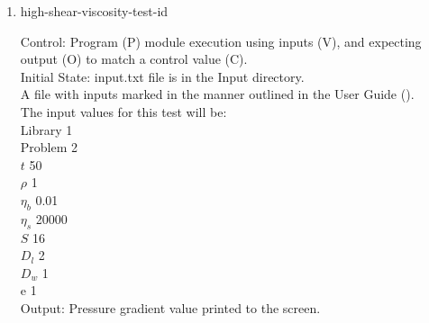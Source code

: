 \documentclass[12pt, titlepage]{article}
\newcommand{\famname}{Lattice Boltzmann Solver}
\newcounter{testcounter} %
\begin{document}
\begin{enumerate}
Output: Pressure gradient value printed to the screen. \\ 

Test Case Derivation: This case is a comparison with the pseudo-oracle pyLBM,
which has a module for Poiseuille Flow. The output pressure gradient value of
this test is to be compared to the C value from the pseudo-oracle,
-1.604e-03.\\
					
How test will be performed: 

\begin{enumerate}
\item Outside of the system, the input parameter values will be written to a text file titled input.txt, as outlined in the User Guide.
\item The file will be placed into the Input directory, under the home directory of the project.
\item {\famname} shall be run.
\item Upon completion of the module, the pressure gradient output value will be compared to the above output value from the pseudo-oracle.
\end{enumerate}	

\item{high-shear-viscosity-test-id\thetestcounter \\}

Control: Program (P) module execution using inputs (V), and expecting output (O)
to match a control value (C).\\
					
Initial State: input.txt file is in the Input directory.\\
					
A file with inputs marked in the manner outlined in the User
Guide (\citet{LBM_UserGuide_PM}).\\The input values for this test will be:\\
Library 1\\
Problem 2\\
$t$ 50\\
$\rho$ 1\\
$\eta_b$ 0.01\\
$\eta_s$ 20000\\
$S$ 16\\
$D_{l}$ 2\\
$D_{w}$ 1\\
$\mathrm{e}$ 1\\
					
Output: Pressure gradient value printed to the screen. \\ 


\end{enumerate}
\end{document}

